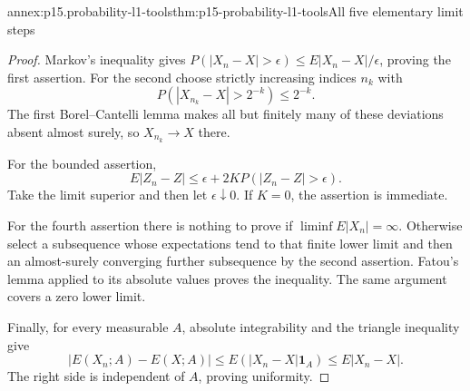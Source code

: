 \begin{annexitem}{annex:p15.probability-l1-tools}{thm:p15-probability-l1-tools}{All five elementary limit steps}
\begin{proof}
Markov's inequality gives
\(P(|X_n-X|>\epsilon)\leq E|X_n-X|/\epsilon\), proving the first assertion.
For the second choose strictly increasing indices \(n_k\) with
\[
                 P(|X_{n_k}-X|>2^{-k})\leq2^{-k}.
\]
The first Borel--Cantelli lemma makes all but finitely many of these
deviations absent almost surely, so \(X_{n_k}\to X\) there.

For the bounded assertion,
\[
                E|Z_n-Z|\leq\epsilon+2K P(|Z_n-Z|>\epsilon).
\]
Take the limit superior and then let \(\epsilon\downarrow0\).
If \(K=0\), the assertion is immediate.

For the fourth assertion there is nothing to prove if
\(\liminf E|X_n|=\infty\). Otherwise select a subsequence whose expectations
tend to that finite lower limit and then an almost-surely converging
further subsequence by the second assertion. Fatou's lemma applied to
its absolute values proves the inequality. The same argument covers a
zero lower limit.

Finally, for every measurable \(A\), absolute integrability and the
triangle inequality give
\[
 |E(X_n;A)-E(X;A)|
        \leq E(|X_n-X|\mathbf1_A)\leq E|X_n-X|.
\]
The right side is independent of \(A\), proving uniformity.
\end{proof}
\end{annexitem}

